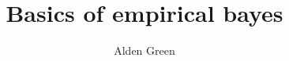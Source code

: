 \documentclass{article}
\begin{document}
	\title{{ \bf Basics of empirical bayes}}
	\author{Alden Green}
	\date{}
	\maketitle
	\RaggedRight
\end{document}
